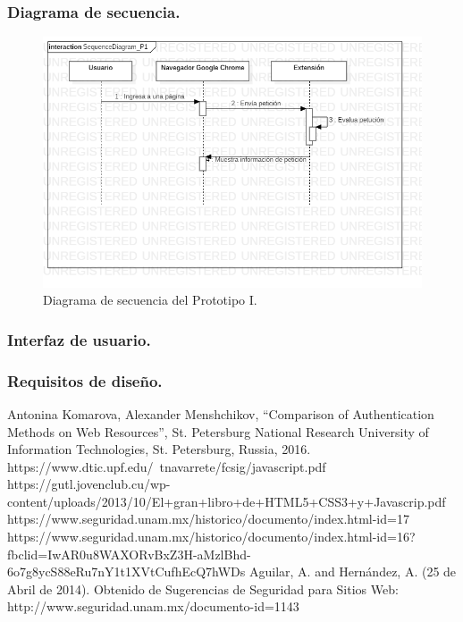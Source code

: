 \documentclass[12pt, a4paper, titlepage]{article}
\begin{document}
			\subsubsection{Diagrama de secuencia.}
		    	\begin{figure}[!htb]
				    \begin{center}
			            \includegraphics[width=15cm]{./imagenes/SequenceDiagram_P1.png}
				        \caption{Diagrama de secuencia del Prototipo I.}
			        \end{center}
			    \end{figure}
			\subsubsection{Interfaz de usuario.}
			\subsubsection{Requisitos de diseño.}
	\begin{thebibliography}{20}
	     Antonina Komarova, Alexander Menshchikov, “Comparison of Authentication Methods on Web Resources”, St. Petersburg National Research University of Information Technologies, St. Petersburg, Russia, 2016.
		 https://www.dtic.upf.edu/~tnavarrete/fcsig/javascript.pdf 
		 https://gutl.jovenclub.cu/wp-content/uploads/2013/10/El+gran+libro+de+HTML5+CSS3+y+Javascrip.pdf
		 https://www.seguridad.unam.mx/historico/documento/index.html-id=17
		https://www.seguridad.unam.mx/historico/documento/index.html-id=16?fbclid=IwAR0u8WAXORvBxZ3H-aMzlBhd-6o7g8ycS88eRu7nY1t1XVtCufhEcQ7hWDs
		 Aguilar, A. and Hernández, A. (25 de Abril de 2014). Obtenido de Sugerencias de Seguridad para Sitios Web: http://www.seguridad.unam.mx/documento-id=1143
		
	\end{thebibliography}		
\end{document}

